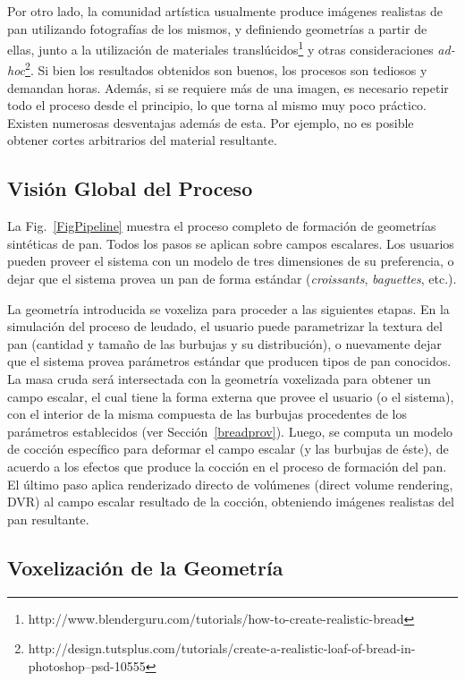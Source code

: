 Por otro lado, la comunidad artística usualmente produce imágenes realistas de pan utilizando fotografías de los mismos, y definiendo geometrías a partir de ellas, junto a la utilización de materiales translúcidos\footnote{http://www.blenderguru.com/tutorials/how-to-create-realistic-bread} y otras consideraciones {\em ad-hoc}\footnote{http://design.tutsplus.com/tutorials/create-a-realistic-loaf-of-bread-in-photoshop--psd-10555}.
Si bien los resultados obtenidos son buenos, los procesos son tediosos y demandan horas.
Además, si se requiere más de una imagen, es necesario repetir todo el proceso desde el principio, lo que torna al mismo muy poco práctico.
Existen numerosas desventajas además de esta.
Por ejemplo, no es posible obtener cortes arbitrarios del material resultante.


\subsection{Visión Global del Proceso}
La Fig.~\ref{FigPipeline} muestra el proceso completo de formación de geometrías sintéticas de pan.
Todos los pasos se aplican sobre campos escalares.
Los usuarios pueden proveer el sistema con un modelo de tres dimensiones de su preferencia, o dejar que el sistema provea un pan de forma estándar ({\em croissants}, {\em baguettes}, etc.).

La geometría introducida se voxeliza para proceder a las siguientes etapas.
En la simulación del proceso de leudado, el usuario puede parametrizar la textura del pan (cantidad y tamaño de las burbujas y su distribución), o nuevamente dejar que el sistema provea parámetros estándar que producen tipos de pan conocidos.
La masa cruda será intersectada con la geometría voxelizada para obtener un campo escalar, el cual tiene la forma externa que provee el usuario (o el sistema), con el interior de la misma compuesta de las burbujas procedentes de los parámetros establecidos (ver Sección~\ref{breadprov}).
Luego, se computa un modelo de cocción específico \cite{Powathil2004} para deformar el campo escalar (y las burbujas de éste), de acuerdo a los efectos que produce la cocción en el proceso de formación del pan.
El último paso aplica renderizado directo de volúmenes (direct volume rendering, DVR) \cite{Kruger2003} al campo escalar resultado de la cocción, obteniendo imágenes realistas del pan resultante.


\subsection{Voxelización de la Geometría}

